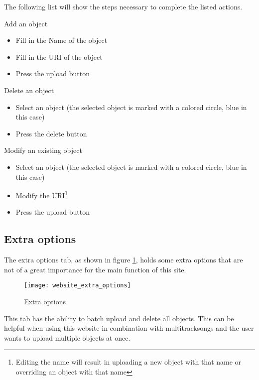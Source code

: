 The following list will show the steps necessary to complete the listed actions.
\begin{shortlist}
    \item Add an object
    \begin{itemize}
        \item Fill in the Name of the object
        \item Fill in the URI of the object
        \item Press the upload button
    \end{itemize}
    \item Delete an object
    \begin{itemize}
        \item Select an object (the selected object is marked with a colored circle, blue in this case)
        \item Press the delete button
    \end{itemize}
    \item Modify an existing object
    \begin{itemize}
        \item Select an object (the selected object is marked with a colored circle, blue in this case)
        \item Modify the URI\footnote{Editing the name will result in uploading a new object with that name or overriding an object with that name}
        \item Press the upload button
    \end{itemize}
\end{shortlist}

\subsection{Extra options}
\label{sub:website_Extra_options}
The extra options tab, as shown in figure \ref{fig:website_extra_options}, holds some extra options that are not of a great importance for the main function of this site.

\begin{figure}[H]
    \centering
    \texttt{[image: website\_extra\_options]}
    \caption{Extra options}
    \label{fig:website_extra_options}
\end{figure}

This tab has the ability to batch upload and delete all objects.
This can be helpful when using this website in combination with multitrack\footnotemark songs and the user wants to upload multiple objects at once.
